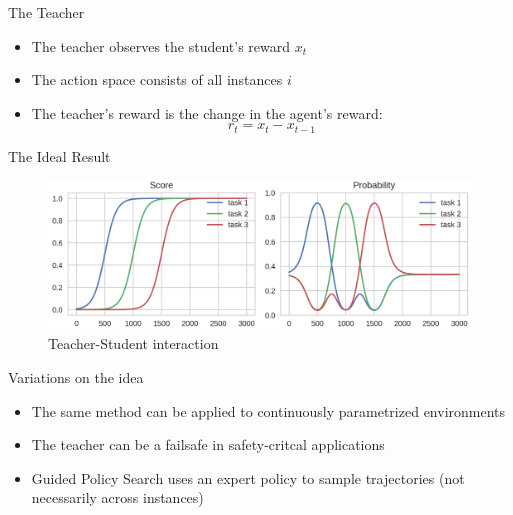 \begin{frame}[c]{The Teacher}
	\begin{itemize}
		\item The teacher observes the student's reward $x_t$
		\item The action space consists of all instances $i$
		\item The teacher's reward is the change in the agent's reward:
			$$ r_t = x_t - x_{t-1}$$
	\end{itemize}
	
\end{frame}

\begin{frame}[c]{The Ideal Result }
	
	\begin{figure}
	\centering
	\includegraphics[scale= 0.5]{images/ideal_teacher.png}
	\caption{Teacher-Student interaction}
	\end{figure}

\end{frame}


\begin{frame}[c]{Variations on the idea}

	\begin{itemize}
		\item The same method can be applied to continuously parametrized environments 
		\item The teacher can be a failsafe in safety-critcal applications 
		\item Guided Policy Search  uses an expert policy to sample trajectories (not necessarily across instances)	
	\end{itemize}

\end{frame}


